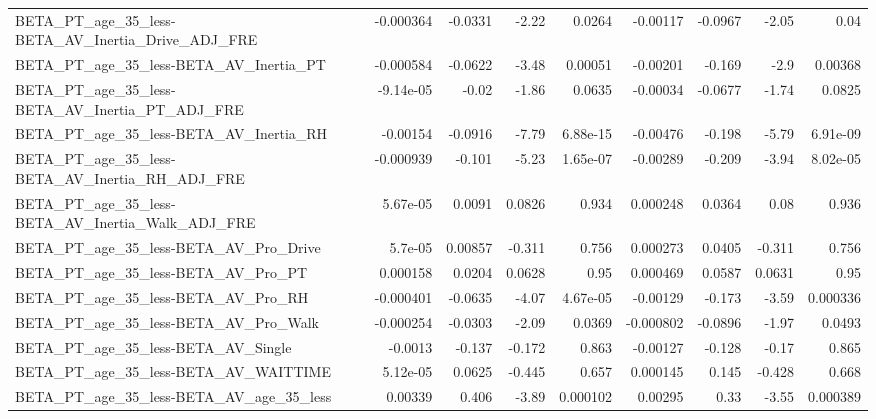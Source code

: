\begin{tabular}{lrrrrrrrr}
BETA\_PT\_age\_35\_less-BETA\_AV\_Inertia\_Drive\_ADJ\_FRE  &   -0.000364 &      -0.0331 &    -2.22 &   0.0264 &   -0.00117 &     -0.0967 &        -2.05 &          0.04 \\
BETA\_PT\_age\_35\_less-BETA\_AV\_Inertia\_PT             &   -0.000584 &      -0.0622 &    -3.48 &  0.00051 &   -0.00201 &      -0.169 &         -2.9 &       0.00368 \\
BETA\_PT\_age\_35\_less-BETA\_AV\_Inertia\_PT\_ADJ\_FRE     &   -9.14e-05 &        -0.02 &    -1.86 &   0.0635 &   -0.00034 &     -0.0677 &        -1.74 &        0.0825 \\
BETA\_PT\_age\_35\_less-BETA\_AV\_Inertia\_RH             &    -0.00154 &      -0.0916 &    -7.79 & 6.88e-15 &   -0.00476 &      -0.198 &        -5.79 &      6.91e-09 \\
BETA\_PT\_age\_35\_less-BETA\_AV\_Inertia\_RH\_ADJ\_FRE     &   -0.000939 &       -0.101 &    -5.23 & 1.65e-07 &   -0.00289 &      -0.209 &        -3.94 &      8.02e-05 \\
BETA\_PT\_age\_35\_less-BETA\_AV\_Inertia\_Walk\_ADJ\_FRE   &    5.67e-05 &       0.0091 &   0.0826 &    0.934 &   0.000248 &      0.0364 &         0.08 &         0.936 \\
BETA\_PT\_age\_35\_less-BETA\_AV\_Pro\_Drive              &     5.7e-05 &      0.00857 &   -0.311 &    0.756 &   0.000273 &      0.0405 &       -0.311 &         0.756 \\
BETA\_PT\_age\_35\_less-BETA\_AV\_Pro\_PT                 &    0.000158 &       0.0204 &   0.0628 &     0.95 &   0.000469 &      0.0587 &       0.0631 &          0.95 \\
BETA\_PT\_age\_35\_less-BETA\_AV\_Pro\_RH                 &   -0.000401 &      -0.0635 &    -4.07 & 4.67e-05 &   -0.00129 &      -0.173 &        -3.59 &      0.000336 \\
BETA\_PT\_age\_35\_less-BETA\_AV\_Pro\_Walk               &   -0.000254 &      -0.0303 &    -2.09 &   0.0369 &  -0.000802 &     -0.0896 &        -1.97 &        0.0493 \\
BETA\_PT\_age\_35\_less-BETA\_AV\_Single                 &     -0.0013 &       -0.137 &   -0.172 &    0.863 &   -0.00127 &      -0.128 &        -0.17 &         0.865 \\
BETA\_PT\_age\_35\_less-BETA\_AV\_WAITTIME               &    5.12e-05 &       0.0625 &   -0.445 &    0.657 &   0.000145 &       0.145 &       -0.428 &         0.668 \\
BETA\_PT\_age\_35\_less-BETA\_AV\_age\_35\_less            &     0.00339 &        0.406 &    -3.89 & 0.000102 &    0.00295 &        0.33 &        -3.55 &      0.000389 \\

\end{tabular}
